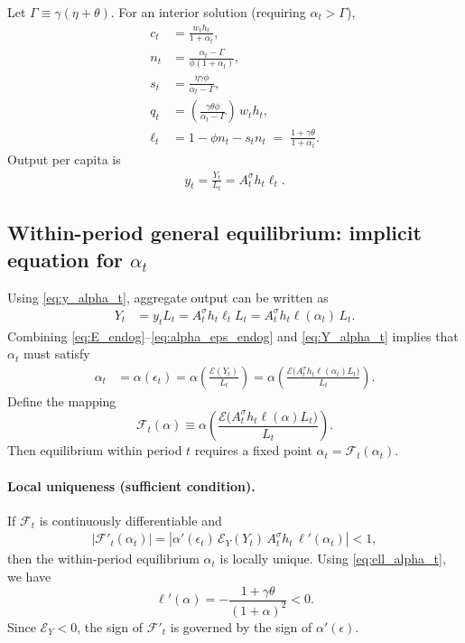 \documentclass[11pt]{article}
\begin{document}
Let $\Gamma\equiv \gamma(\eta+\theta)$. For an interior solution (requiring $\alpha_t>\Gamma$),
\begin{align}
c_t &= \frac{w_t h_t}{1+\alpha_t},
\label{eq:c_alpha_t}\\[4pt]
n_t &= \frac{\alpha_t-\Gamma}{\phi(1+\alpha_t)},
\label{eq:n_alpha_t}\\[4pt]
s_t &= \frac{\eta\gamma\phi}{\alpha_t-\Gamma},
\label{eq:s_alpha_t}\\[4pt]
q_t &= \left(\frac{\gamma\theta\phi}{\alpha_t-\Gamma}\right)\,w_t h_t,
\label{eq:q_alpha_t}\\[4pt]
\ell_t &= 1-\phi n_t - s_t n_t
      \;=\;\frac{1+\gamma\theta}{1+\alpha_t}.
\label{eq:ell_alpha_t}
\end{align}
Output per capita is
\begin{align}
y_t = \frac{Y_t}{L_t} = A_t^{\sigma} h_t \ell_t.
\label{eq:y_alpha_t}
\end{align}

\subsection{Within-period general equilibrium: implicit equation for $\alpha_t$}
Using \eqref{eq:y_alpha_t}, aggregate output can be written as
\begin{align}
Y_t &= y_t L_t = A_t^{\sigma} h_t \ell_t L_t
= A_t^{\sigma} h_t \ell(\alpha_t)\,L_t.
\label{eq:Y_alpha_t}
\end{align}
Combining \eqref{eq:E_endog}--\eqref{eq:alpha_eps_endog} and \eqref{eq:Y_alpha_t} implies that $\alpha_t$ must satisfy
\begin{align}
\alpha_t
&=\alpha\!\left(\epsilon_t\right)
=\alpha\!\left(\frac{\mathcal{E}(Y_t)}{L_t}\right)
=\alpha\!\left(
\frac{\mathcal{E}\!\Big(A_t^{\sigma} h_t \ell(\alpha_t)L_t\Big)}{L_t}
\right).
\label{eq:alpha_fixed_point}
\end{align}
Define the mapping
\[
\mathcal{F}_t(\alpha)\equiv
\alpha\!\left(
\frac{\mathcal{E}\!\Big(A_t^{\sigma} h_t \ell(\alpha)L_t\Big)}{L_t}
\right).
\]
Then equilibrium within period $t$ requires a fixed point $\alpha_t=\mathcal{F}_t(\alpha_t)$.

\paragraph{Local uniqueness (sufficient condition).}
If $\mathcal{F}_t$ is continuously differentiable and
\begin{align}
\left|\mathcal{F}'_t(\alpha_t)\right|
=
\left|
\alpha'(\epsilon_t)\,
\mathcal{E}_Y(Y_t)\,
A_t^{\sigma} h_t\,
\ell'(\alpha_t)
\right|
<1,
\label{eq:uniqueness_cond}
\end{align}
then the within-period equilibrium $\alpha_t$ is locally unique.
Using \eqref{eq:ell_alpha_t}, we have
\[
\ell'(\alpha)=-\frac{1+\gamma\theta}{(1+\alpha)^2}<0.
\]
Since $\mathcal{E}_Y<0$, the sign of $\mathcal{F}'_t$ is governed by the sign of $\alpha'(\epsilon)$.
\end{document}
